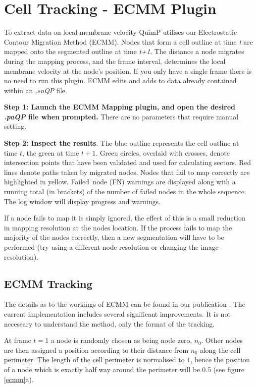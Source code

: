 \documentclass[a4paper,12pt]{article}
\begin{document}
\section{Cell Tracking - ECMM Plugin}

To extract data on local membrane velocity QuimP utilises our Electrostatic Contour Migration Method (ECMM).  
Nodes that form a cell outline at time \textit{t} are mapped onto the segmented outline at time \textit{t+1}.  The distance a node migrates
during the mapping process, and the frame interval, determines the local membrane velocity at the node's position.  If you only have a single
frame there is no need to run this plugin.  ECMM edits and adds to data 
already contained within an \textit{.snQP} file.

\textbf{Step 1: Launch the ECMM Mapping plugin, and open the desired \textit{.paQP} file when prompted.}  There are no parameters that
require manual setting.

\textbf{Step 2: Inspect the results}.  The blue outline represents the cell outline at time $t$, the green at time $t+1$.  
Green circles, overlaid with crosses, denote intersection points that have been validated and used for calculating sectors.  
Red lines denote paths taken by migrated nodes.   Nodes that fail to map correctly are highlighted in yellow.
Failed~node (FN) warnings are displayed along with a running total (in brackets) of the number of failed nodes in the whole sequence.  
The log window will display progress and warnings. 

If a node fails to map it is simply ignored, the effect of this is a small reduction in mapping resolution at the nodes location.
If the process fails to map the majority of the nodes correctly, then a new segmentation will have to be performed
(try using a different node resolution or changing the image resolution).

\subsection{ECMM Tracking}
\label{ecmmTracking}

The details as to the workings of ECMM can be found in our publication \cite{Tyson2010}.
The current implementation includes several significant improvements.  It is not necessary to understand the method,
only the format of the tracking.

At frame $t=1$ a node is randomly chosen as being node zero, $n_{0}$.  Other nodes are then assigned a position
according to their distance from $n_{0}$ along the cell perimeter.  The length of the cell perimeter 
is normalised to $1$, hence the position of a node which is exactly half way around the perimeter will be 0.5
(see figure \ref{ecmm}a).
\end{document}
